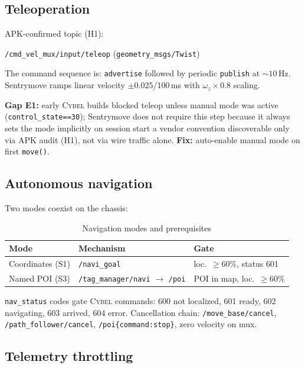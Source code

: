 \documentclass[conference]{IEEEtran}
\newcommand{\cybel}{\textsc{Cybel}}
\begin{document}
\subsection{Teleoperation}

APK-confirmed topic (H1):
\begin{center}
\texttt{/cmd\_vel\_mux/input/teleop} \quad (\texttt{geometry\_msgs/Twist})
\end{center}
The command sequence is: \texttt{advertise} followed by periodic \texttt{publish} at ${\sim}10$\,Hz.
Sentrymove ramps linear velocity $\pm 0.025$/100\,ms with $\omega_z \times 0.8$ scaling.

\textbf{Gap E1:} early \cybel{} builds blocked teleop unless manual mode was active (\texttt{control\_state==30}); Sentrymove does not require this step because it always sets the mode implicitly on session start a vendor convention discoverable only via APK audit (H1), not via wire traffic alone.
\textbf{Fix:} auto-enable manual mode on first \texttt{move()}.

\subsection{Autonomous navigation}

Two modes coexist on the chassis:

\begin{table}[!t]
\caption{Navigation modes and prerequisites}
\label{tab:nav}
\centering
\scriptsize
\begin{tabular}{@{}lll@{}}
\toprule
\textbf{Mode} & \textbf{Mechanism} & \textbf{Gate} \\
\midrule
Coordinates (S1) & \texttt{/navi\_goal} & loc.\ ${\geq}60\%$, status 601 \\
Named POI (S3) & \texttt{/tag\_manager/navi} $\rightarrow$ \texttt{/poi} & POI in map, loc.\ ${\geq}60\%$ \\
\bottomrule
\end{tabular}
\end{table}

\texttt{nav\_status} codes gate \cybel{} commands: 600 not localized, 601 ready, 602 navigating, 603 arrived, 604 error.
Cancellation chain: \texttt{/move\_base/cancel}, \texttt{/path\_follower/cancel}, \texttt{/poi\{command:stop\}}, zero velocity on mux.

\subsection{Telemetry throttling}
\end{document}
